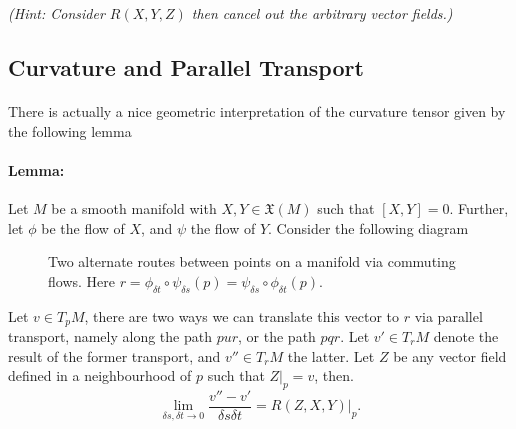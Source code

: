 \documentclass[11pt,fleqn]{report}
\begin{document}
\textit{(Hint: Consider $R(X,Y,Z)$ then cancel out the arbitrary vector fields.)}

\subsection{Curvature and Parallel Transport}

\paragraph{} There is actually a nice geometric interpretation of the curvature tensor given by the following lemma

\paragraph{Lemma:} Let $M$ be a smooth manifold with $X,Y \in \mathfrak{X}(M)$ such that $[X,Y]=0$. Further, let $\phi$ be the flow of $X$, and $\psi$ the flow of $Y$.
Consider the following diagram

\begin{figure}[h]
	\begin{center}
	\caption{Two alternate routes between points on a manifold via commuting flows. Here $r = \phi_{\delta t} \circ \psi_{\delta s}(p) = \psi_{\delta s} \circ \phi_{\delta t}(p)$.}
	\end{center}
\end{figure}

Let $v \in T_pM$, there are two ways we can translate this vector to $r$ via parallel transport, namely along the path $pur$, or the path $pqr$. Let $v' \in T_rM$ denote the result of the former transport, and $v'' \in T_rM$ the latter. Let $Z$ be any vector field defined in a neighbourhood of $p$ such that $Z\vert_p = v$, then.
	\begin{equation}
		\lim_{\delta s, \delta t \to 0} \frac{v'' - v'}{\delta s \delta t} = R(Z,X,Y)\vert_{p}.
	\end{equation}
	
\end{document}
